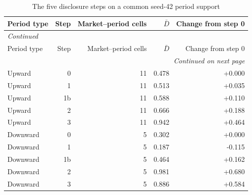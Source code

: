 \scriptsize
\begin{longtable}{lrrrr}
\caption{The five disclosure steps on a common seed-42 period support}\label{tab:app-common-support}\\
\toprule
Period type & Step & Market--period cells & $\bar D$ & Change from step 0 \\
\midrule
\endfirsthead
\multicolumn{5}{l}{\textit{Continued}}\\
\toprule
Period type & Step & Market--period cells & $\bar D$ & Change from step 0 \\
\midrule
\endhead
\midrule
\multicolumn{5}{r}{\textit{Continued on next page}}\\
\endfoot
\bottomrule
\endlastfoot
Upward & 0 & 11 & 0.478 & +0.000 \\
Upward & 1 & 11 & 0.513 & +0.035 \\
Upward & 1b & 11 & 0.588 & +0.110 \\
Upward & 2 & 11 & 0.666 & +0.188 \\
Upward & 3 & 11 & 0.942 & +0.464 \\
Downward & 0 & 5 & 0.302 & +0.000 \\
Downward & 1 & 5 & 0.187 & -0.115 \\
Downward & 1b & 5 & 0.464 & +0.162 \\
Downward & 2 & 5 & 0.981 & +0.680 \\
Downward & 3 & 5 & 0.886 & +0.584 \\
\end{longtable}
